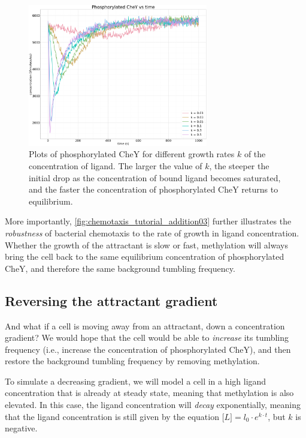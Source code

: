 \begin{figure}[h]
\centering
\mySfFamily
\includegraphics[width = 0.7\textwidth]{../images/chemotaxis_tutorial_addition03.png}
\caption{Plots of phosphorylated CheY for different growth rates $k$ of the concentration of ligand. The larger the value of $k$, the steeper the initial drop as the concentration of bound ligand becomes saturated, and the faster the concentration of phosphorylated CheY returns to equilibrium.}
\label{fig:chemotaxis_tutorial_addition03}
\end{figure}

More importantly, \autoref{fig:chemotaxis_tutorial_addition03} further illustrates the \textit{robustness} of bacterial chemotaxis to the rate of growth in ligand concentration. Whether the growth of the attractant is slow or fast, methylation will always bring the cell back to the same equilibrium concentration of phosphorylated CheY, and therefore the same background tumbling frequency.

\FloatBarrier
{}
\subsection{Reversing the attractant gradient}

And what if a cell is moving away from an attractant, down a concentration gradient? We would hope that the cell would be able to \textit{increase} its tumbling frequency (i.e., increase the concentration of phosphorylated CheY), and then restore the background tumbling frequency by removing methylation.

To simulate a decreasing gradient, we will model a cell in a high ligand concentration that is already at steady state, meaning that methylation is also elevated. In this case, the ligand concentration will \textit{decay} exponentially, meaning that the ligand concentration is still given by the equation $\text{[}L{]} = l_0 \cdot e^{k \cdot t}$, but $k$ is negative.\\

